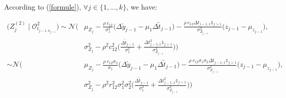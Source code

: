 According to (\ref{formule}), $\forall j \in \{1,...,k\}$, we have:

\begin{align}
\bigg(Z_j^{(2)} \mid \mathcal{O}^2_{t_{j-1,n_{j-1}}} \bigg ) \sim \mathcal{N} \bigg(&\mu_{Z_j} - \frac{\rho\ c_{12} }{\sigma_1^2}\big( \Delta \tilde y_{j-1}-\mu_1 \Delta \tilde t_{j-1}\big)- \frac{\rho\ c_{12}  \Delta t_{j-1,1}\mathds{1}_{j>1} }{\sigma^2_{Z_{j-1}}}\big(z_{j-1}- \mu_{z_{j-1}}\big) , \nonumber\\
&\sigma^2_{Z_j}-\rho^2 c_{12}^2 \bigg(\frac{\Delta \tilde t_{j-1}}{\sigma_1^2}+ \frac{\Delta t_{j-1,1}^2 \mathds{1}_{j>1} }{\sigma^2_{Z_{j-1}}}\bigg)\bigg) \nonumber \\
 \sim \mathcal{N} \bigg(&\mu_{Z_j} - \frac{\rho\ r_{12} \sigma_2 }{\sigma_1}\big( \Delta \tilde y_{j-1}-\mu_1 \Delta \tilde t_{j-1}\big)- \frac{\rho\ r_{12} \sigma_1\sigma_2  \Delta t_{j-1,1}\mathds{1}_{j>1} }{\sigma^2_{Z_{j-1}}}\big(z_{j-1}- \mu_{z_{j-1}}\big) , \nonumber\\
&\sigma^2_{Z_j}-\rho^2 r_{12}^2  \sigma_1^2\sigma_2^2 \bigg(\frac{\Delta \tilde t_{j-1}}{\sigma_1^2}+ \frac{\Delta t_{j-1,1}^2 \mathds{1}_{j>1} }{\sigma^2_{Z_{j-1}}}\bigg)\bigg)
\end{align}

